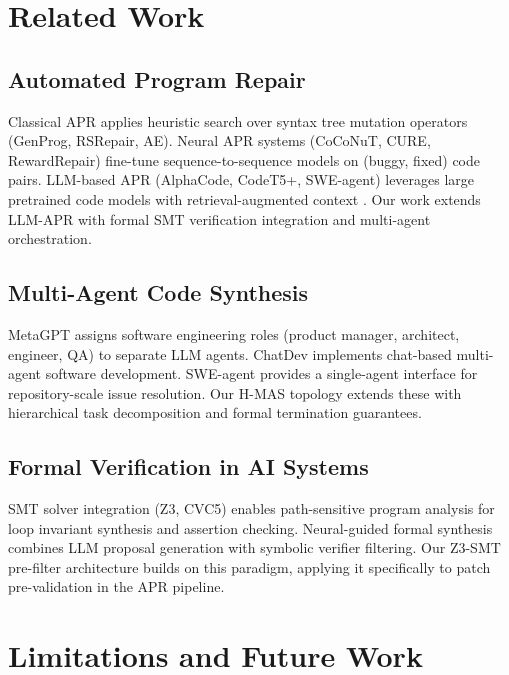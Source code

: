 \documentclass[10pt,journal,compsoc,twocolumn]{IEEEtran}
\begin{document}
\section{Related Work}



\subsection{Automated Program Repair}


Classical APR applies heuristic search over syntax tree mutation operators (GenProg, RSRepair, AE). Neural APR systems (CoCoNuT, CURE, RewardRepair) fine-tune sequence-to-sequence models on (buggy, fixed) code pairs. LLM-based APR (AlphaCode, CodeT5+, SWE-agent) leverages large pretrained code models with retrieval-augmented context \cite{arxiv_2405_01543,arxiv_2501_02497}. Our work extends LLM-APR with formal SMT verification integration and multi-agent orchestration.


\subsection{Multi-Agent Code Synthesis}


MetaGPT \cite{crossref_10_48550_arxiv_2308_00352} assigns software engineering roles (product manager, architect, engineer, QA) to separate LLM agents. ChatDev \cite{crossref_10_18653_v1_2024_acl_long_810} implements chat-based multi-agent software development. SWE-agent \cite{crossref_10_48550_arxiv_2405_15793} provides a single-agent interface for repository-scale issue resolution. Our H-MAS topology extends these with hierarchical task decomposition and formal termination guarantees.


\subsection{Formal Verification in AI Systems}


SMT solver integration (Z3, CVC5) enables path-sensitive program analysis for loop invariant synthesis and assertion checking. Neural-guided formal synthesis combines LLM proposal generation with symbolic verifier filtering. Our Z3-SMT pre-filter architecture builds on this paradigm, applying it specifically to patch pre-validation in the APR pipeline.




\section{Limitations and Future Work}
\end{document}

